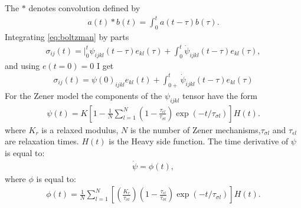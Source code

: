 \documentclass[11pt]{article}
\begin{document}
The $*$ denotes convolution defined by
\begin{eqnarray}
a(t)*b(t)=\int_0^t a(t-\tau)b(\tau).
\end{eqnarray}
Integrating \eqref{eq:boltzman} by parts
\begin{eqnarray}
\sigma_{ij}(t)=|_0^t \psi_{ijkl}(t-\tau)e_{kl}(\tau) +\int_0^t \dot{\psi}_{ijkl}(t-\tau)e_{kl}(\tau),
\end{eqnarray}
and using $e(t=0)=0$ I get
\begin{eqnarray}
\sigma_{ij}(t)=\psi(0)_{ijkl}e_{kl}(t) +\int_{0+}^t \dot{\psi}_{ijkl}(t-\tau)e_{kl}(\tau)
\end{eqnarray}
For the Zener model the components of the $\psi_{ijkl}$ tensor have the form
\begin{eqnarray}
  \psi(t)=K\left[1-\frac{1}{N}\sum_{l=1}^N 
            (1-\frac{\tau_{\epsilon l}}{\tau_{\sigma l}})\exp(-t/\tau_{\sigma l})\right]H(t).
\end{eqnarray}
%
where $K_r$ is a relaxed modulus, $N$ is the number of Zener mechanisms,$\tau_{\sigma l}$
and $\tau_{\epsilon l}$ are relaxation times. $H(t)$ is the Heavy side function.
The time derivative of $\psi$ is equal to:
\begin{eqnarray}
\dot{\psi} = \phi(t),
\end{eqnarray}
where $\phi$ is equal to:
\begin{eqnarray}
\phi(t)=
  \frac{1}{N}\sum_{l=1}^N\left[\left(\frac{K_r}{\tau_{\sigma l}}\right) 
            \left(1-\frac{\tau_{\epsilon l}}{\tau_{\sigma l}}\right)\exp(-t/\tau_{\sigma l})\right]H(t).
                \label{eq:phi}
\end{eqnarray}
\end{document}
